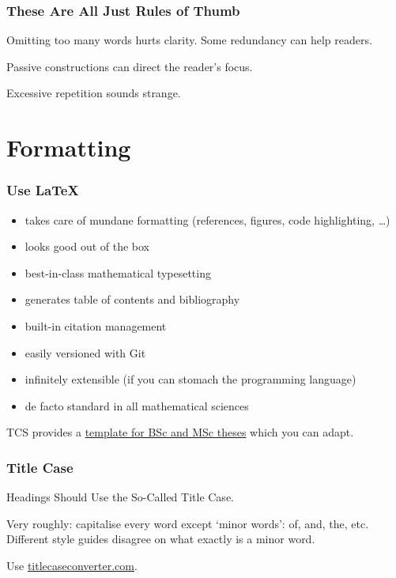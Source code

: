 \documentclass[xetex]{beamer}
\begin{document}
\begin{frame}
  \frametitle{These Are All Just Rules of Thumb}

  Omitting too many words hurts clarity.
  Some redundancy can help readers.

  \medskip

  Passive constructions can direct the reader's focus.

  \medskip

  Excessive repetition sounds strange.
\end{frame}

\section{Formatting}

\begin{frame}
  \frametitle{Use \LaTeX}

  \begin{itemize}
    \item takes care of mundane formatting (references, figures, code highlighting, \dots)
    \item looks good out of the box
    \item best-in-class mathematical typesetting
    \item generates table of contents and bibliography
    \item built-in citation management
    \item easily versioned with Git
    \item infinitely extensible (if you can stomach the programming language)
    \item de facto standard in all mathematical sciences
  \end{itemize}

  \medskip

  TCS provides a \href{https://www.tcs.ifi.lmu.de/lehre/bsc-master-arbeiten_de.html}{template for BSc and MSc theses} which you can adapt.
\end{frame}

\begin{frame}
  \frametitle{Title Case}

  Headings Should Use the So-Called Title Case.

  \medskip

  Very roughly: capitalise every word except \enquote*{minor words}: of, and, the, etc.
  Different style guides disagree on what exactly is a minor word.

  \medskip

  Use \url{titlecaseconverter.com}.
\end{frame}
\end{document}
